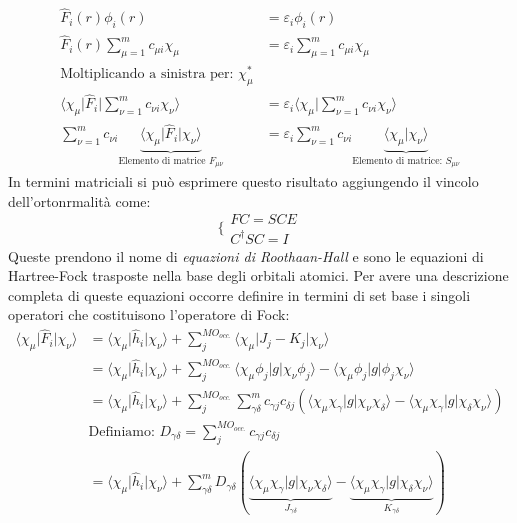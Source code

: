 \documentclass[oneside]{amsbook}
\numberwithin{section}{chapter}
\numberwithin{equation}{section}
\numberwithin{figure}{section}
\begin{document}
\begin{equation}
\begin{aligned}
\hat{F}_i(r) \phi_i(r)&= \varepsilon_i\phi_i(r) \\
\hat{F}_i(r)\sum \limits_{\mu = 1}^m c_{\mu i }\chi_{\mu}&= \varepsilon_i\sum \limits_{\mu = 1}^m c_{\mu i }\chi_{\mu}\\
\text{Moltiplicando a sinistra per: } \chi^*_{\mu} \\
\langle \chi_{\mu}\vert \hat{F}_i\vert\sum \limits_{\nu = 1}^m c_{\nu i }\chi_{\nu}\rangle &= \varepsilon_i \langle \chi_{\mu}\vert\sum \limits_{\nu = 1}^m c_{\nu i }\chi_{\nu}\rangle\\
\sum \limits_{\nu = 1}^m c_{\nu i }\underbrace{\langle \chi_{\mu}\vert \hat{F}_i\vert\chi_{\nu}\rangle}_{\text{Elemento di matrice }F_{\mu \nu} } &= \varepsilon_i \sum \limits_{\nu = 1}^m c_{\nu i }\underbrace{\langle \chi_{\mu}\vert\chi_{\nu}\rangle}_{\text{Elemento di matrice: } S _{\mu \nu}}
\end{aligned}
\end{equation}
In termini matriciali si può esprimere questo risultato aggiungendo il vincolo dell'ortonrmalità come:
\begin{equation}
\biggr \{ 
\begin{aligned}
FC = SCE \\
C^{\dagger}SC=I
\end{aligned}
\end{equation}
Queste prendono il nome di \emph{equazioni di Roothaan-Hall} e sono le equazioni di Hartree-Fock trasposte nella base degli orbitali atomici.
Per avere una descrizione completa di queste equazioni occorre definire in termini di set base i singoli operatori che costituisono l'operatore di Fock:
\begin{equation}
\begin{aligned}
\langle \chi_{\mu}\vert \hat{F}_i\vert\chi_{\nu}\rangle &= \langle \chi_{\mu}\vert \hat{h}_i\vert\chi_{\nu}\rangle + \sum \limits _{j} ^{MO_{occ.}}\langle \chi_{\mu}\vert J_j-K_j\vert\chi_{\nu}\rangle\\
&= \langle \chi_{\mu}\vert \hat{h}_i\vert\chi_{\nu}\rangle + \sum \limits _{j} ^{MO_{occ.}}\langle\chi_{\mu}\phi_j\vert g \vert\chi_{\nu}\phi_j\rangle-\langle\chi_{\mu}\phi_j\vert g \vert\phi_j\chi_{\nu}\rangle\\
&= \langle \chi_{\mu}\vert \hat{h}_i\vert\chi_{\nu}\rangle + \sum \limits _{j} ^{MO_{occ.}}\sum \limits _{\gamma \delta} ^{m}c_{\gamma j} c_{\delta j}(\langle\chi_{\mu}\chi_{\gamma}\vert g \vert\chi_{\nu}\chi_{\delta}\rangle-\langle\chi_{\mu}\chi_{\gamma}\vert g \vert\chi_{\delta}\chi_{\nu}\rangle)\\
&\text{Definiamo: } D_{\gamma\delta }=\sum \limits _{j} ^{MO_{occ.}}c_{\gamma j} c_{\delta j} \\
&= \langle \chi_{\mu}\vert \hat{h}_i\vert\chi_{\nu}\rangle + \sum \limits _{\gamma \delta} ^{m}D_{\gamma\delta }(\underbrace{\langle\chi_{\mu}\chi_{\gamma}\vert g \vert\chi_{\nu}\chi_{\delta}\rangle}_{J_{\gamma\delta }}-\underbrace{\langle\chi_{\mu}\chi_{\gamma}\vert g \vert\chi_{\delta}\chi_{\nu}\rangle}_{K_{\gamma\delta }})\\
\end{aligned} 
\end{equation}
\end{document}
